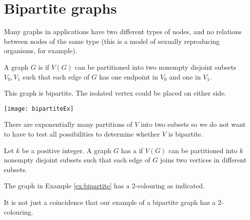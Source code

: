 \chapter{Bipartite graphs} %


Many graphs in applications have two different types of nodes, and no
relations between nodes of the same type (this is a model of sexually
reproducing organisms, for example).

\begin{Definition}
A graph $G$ is  if $V(G)$  can be partitioned into
two nonempty disjoint subsets $V_0, V_1$ such that each edge of $G$
has one endpoint in $V_0$ and one in $V_1$.
\end{Definition}

\begin{Boxample} \label{ex:bipartite}
This graph is bipartite.  
The isolated vertex could be placed on either side.
\begin{center}
\texttt{[image: bipartiteEx]} 
\end{center}
\end{Boxample}


There are exponentially many partitions of $V$ into two subsets so we
do not want to have to test all possibilities to determine whether $V$ is bipartite.

\begin{Definition}
Let $k$ be a positive integer. A graph $G$ has a 
if $V(G)$ can be partitioned into $k$ nonempty disjoint subsets such
that each edge of $G$ joins two vertices in different subsets.
\end{Definition}

\begin{Example}
The graph in Example \ref{ex:bipartite} has a 2-colouring as indicated.
\end{Example}

It is not just a coincidence that our example of a bipartite graph
has a 2-colouring.

